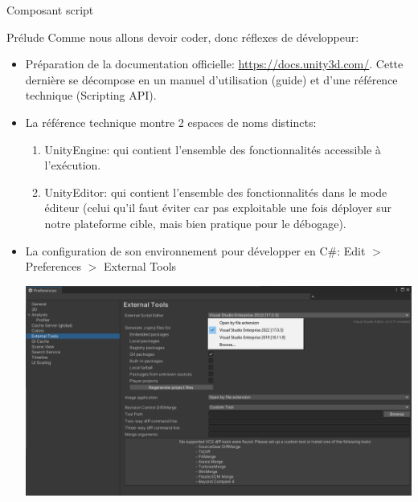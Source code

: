 \begin{frame}[fragile]{Composant script}
	\begin{block}{Prélude}
		Comme nous allons devoir coder, donc réflexes de développeur:
		\begin{itemize}
			\item Préparation de la documentation officielle: \url{https://docs.unity3d.com/}. Cette dernière se décompose en un manuel d'utilisation (guide) et d'une référence technique (Scripting API).
			\item La référence technique montre 2 espaces de noms distincts:
			\begin{enumerate}
				\item UnityEngine: qui contient l'ensemble des fonctionnalités accessible à l'exécution.
				\item UnityEditor: qui contient l'ensemble des fonctionnalités dans le mode éditeur (celui qu'il faut éviter car pas exploitable une fois déployer sur notre plateforme cible, mais bien pratique pour le débogage).
			\end{enumerate}
			\item La configuration de son environnement pour développer en C\#: Edit $>$ Preferences $>$ External Tools
			
\begin{center}
	\includegraphics[width=0.8\linewidth]{../../imgs/unity_param_exttools}
\end{center}
		\end{itemize}
	\end{block}
\end{frame}


